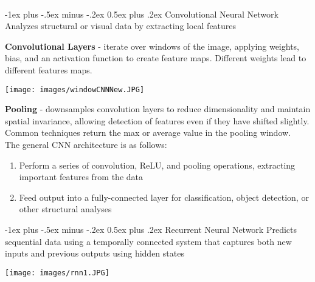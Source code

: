 \documentclass[10pt,landscape]{article}
\makeatletter
\renewcommand{\section}{\@startsection{section}{1}{0mm}%
                                {-1ex plus -.5ex minus -.2ex}%
                                {0.5ex plus .2ex}%
                                {\normalfont\large\bfseries}}
\makeatother
\begin{document}
\begin{multicols}{3}
\columnbreak
\textcolor{white}{.}\vspace{-5mm}\\ %
\section{Convolutional Neural Network}
Analyzes structural or visual data by extracting local features 

\textbf{Convolutional Layers} - iterate over windows of the image, applying weights, bias, and an activation function to create feature maps. Different weights lead to different features maps.
\vspace{-4mm}
\begin{center}
    \texttt{[image: images/windowCNNNew.JPG]}
\end{center}
\vspace{-2mm}
\textbf{Pooling} - downsamples convolution layers to reduce dimensionality and maintain spatial invariance, allowing detection of features even if they have shifted slightly. Common techniques return the max or average value in the pooling window.\\
\smallskip
The general CNN architecture is as follows:
\begin{enumerate}[leftmargin=5mm]
\itemsep -.4mm 
\item Perform a series of convolution, ReLU, and pooling operations, extracting important features from the data 
\item Feed output into a fully-connected layer for classification, object detection, or other structural analyses
\end{enumerate}

\section{Recurrent Neural Network}
Predicts sequential data using a temporally connected system that captures both new inputs and previous outputs using hidden states
\begin{center}
\vspace{-2mm}
    \texttt{[image: images/rnn1.JPG]}
\end{center}
\vspace{-2mm}


\end{multicols}
\end{document}
